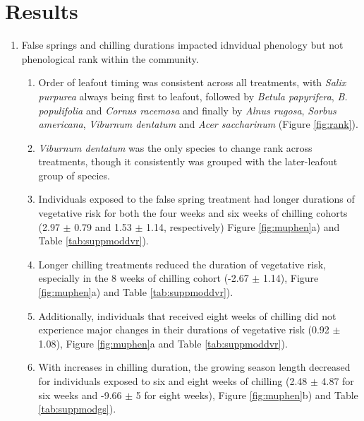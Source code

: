 \documentclass{article}\usepackage[]{graphicx}\usepackage[]{color}
\begin{document}
\section*{Results}
\begin{enumerate}
\item False springs and chilling durations impacted idnvidual phenology but not phenological rank within the community. 
  \begin{enumerate}
  \item Order of leafout timing was consistent across all treatments, with \textit{Salix purpurea} always being first to leafout, followed by \textit{Betula papyrifera}, \textit{B. populifolia} and \textit{Cornus racemosa} and finally by \textit{Alnus rugosa}, \textit{Sorbus americana}, \textit{Viburnum dentatum} and \textit{Acer saccharinum} (Figure \ref{fig:rank}).
  \item \textit{Viburnum dentatum} was the only species to change rank across treatments, though it consistently was grouped with the later-leafout group of species.
  \item Individuals exposed to the false spring treatment had longer durations of vegetative risk for both the four weeks and six weeks of chilling cohorts (2.97 $\pm$ 0.79 and 1.53 $\pm$ 1.14, respectively) Figure \ref{fig:muphen}a) and Table \ref{tab:suppmoddvr}).
  \item Longer chilling treatments reduced the duration of vegetative risk, especially in the 8 weeks of chilling cohort (-2.67 $\pm$ 1.14), Figure \ref{fig:muphen}a) and Table \ref{tab:suppmoddvr}).
  \item Additionally, individuals that received eight weeks of chilling did not experience major changes in their durations of vegetative risk (0.92 $\pm$ 1.08), Figure \ref{fig:muphen}a and Table \ref{tab:suppmoddvr}). 
  \item With increases in chilling duration, the growing season length decreased for individuals exposed to six and eight weeks of chilling (2.48 $\pm$ 4.87 for six weeks and -9.66 $\pm$ 5 for eight weeks), Figure \ref{fig:muphen}b) and Table \ref{tab:suppmodgs}).
  \end{enumerate}
  

\end{enumerate}
\end{document}
